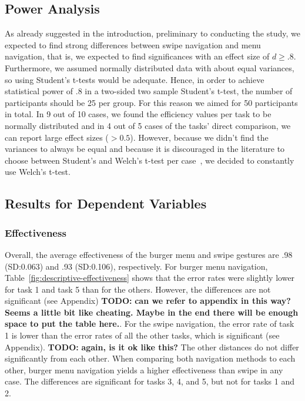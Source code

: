 \documentclass{sig-alternate-05-2015}
\newcommand{\todo}{\textbf{TODO:} \textbf}
\begin{document}
\subsection{Power Analysis}
As already suggested in the introduction, preliminary to conducting the study, we expected to find strong differences between swipe navigation and menu navigation, that is,
we expected to find significances with an effect size of $d \geq .8$.
Furthermore, we assumed normally distributed data with about equal variances, so using Student's t-tests would be adequate. Hence, in order to achieve statistical power of .8 in a 
two-sided two sample Student's t-test, the number 
of participants should be 25 per group. For this reason we aimed for 50 participants in total.
In 9 out of 10 cases, we found the efficiency values per task to be normally distributed
and in 4 out of 5 cases of the tasks' direct comparison, we can report large effect sizes ($> 0.5$).
However, because we didn't find the variances to always be equal and because it is discouraged
in the literature to choose between Student's and Welch's t-test per case~\cite{levenes:sucks}, we decided to constantly use Welch's t-test.
\subsection{Results for Dependent Variables}
\subsubsection{Effectiveness}
Overall, the average effectiveness of the burger menu and swipe gestures are .98 (SD:\@0.063) and .93 (SD:\@0.106), respectively. For burger menu navigation, 
Table~\ref{fig:descriptive-effectiveness} shows that the error rates were slightly lower for task 1 and task 5 than for the others. However, the differences
are not significant (see Appendix)
\todo{can we refer to appendix in this way? Seems a little bit like cheating. Maybe in the end there will be enough space to put the table here.}. For the swipe navigation, the error rate of task 1 is lower than the error rates of all the other
tasks, which is significant (see Appendix).
\todo{again, is it ok like this?}
The other distances do not differ significantly from each other. When
comparing both navigation methods to each other, burger menu navigation yields a higher effectiveness than swipe in any case.
The differences are significant for tasks 3, 4, and 5,
but not for tasks 1 and 2.
\begin{table}[!h]
\centering
\caption{Mean (standard deviation) of effectiveness}
\label{fig:descriptive-effectiveness}
\end{table}
\end{document}
